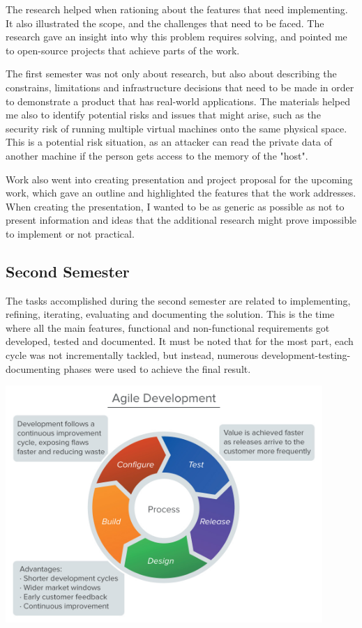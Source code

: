 \documentclass{article}
\begin{document}
\begin{appendices}
The research helped when rationing about the features that need implementing. It also illustrated the scope, and the challenges that need to be faced. The research gave an insight into why this problem requires solving, and pointed me to open-source projects that achieve parts of the work.

The first semester was not only about research, but also about describing the constrains, limitations and infrastructure decisions that need to be made in order to demonstrate a  product that has real-world applications.
The materials helped me also to identify potential risks and issues that might arise, such as the security risk of running multiple virtual machines onto the same physical space. This is a potential risk situation, as an attacker can read the private data of another machine if the person gets access to the memory of the "host".

Work also went into creating presentation and project proposal for the upcoming work, which gave an outline and highlighted the features that the work addresses.
When creating the presentation, I wanted to be as generic as possible as not to present information and ideas that the additional research might prove impossible to implement or not practical.

\subsection{Second Semester}

The tasks accomplished during the second semester are related to implementing, refining, iterating, evaluating and documenting the solution. This is the time where all the main features, functional and non-functional requirements got developed, tested and documented. It must be noted that for the most part, each cycle was not incrementally tackled, but instead, numerous development-testing-documenting phases were used to achieve the final result.
\begin{center}
	\includegraphics[width=12cm]{agile.jpg}
\end{center}


\end{appendices}
\end{document}
